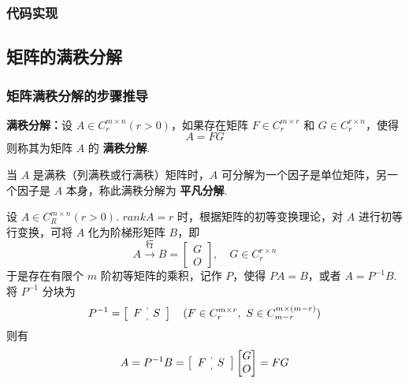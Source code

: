         \subsubsection{代码实现}
            

    \subsection{矩阵的满秩分解}
        \subsubsection{矩阵满秩分解的步骤推导}
            \par \textbf{满秩分解：}设 $A \in C_r^{m \times n}(r > 0)$，如果存在矩阵 $F \in C_r^{m \times r}$ 和 $G \in C_r^{r \times n}$，使得
            \begin{equation*}
                A = FG
            \end{equation*}
            则称其为矩阵 $A$ 的 \textbf{满秩分解}.
            \par 当 $A$ 是满秩（列满秩或行满秩）矩阵时，$A$ 可分解为一个因子是单位矩阵，另一个因子是 $A$ 本身，称此满秩分解为 \textbf{平凡分解}.
            \par 设 $A \in C_R^{m \times n}(r > 0)$. $rankA = r$ 时，根据矩阵的初等变换理论，对 $A$ 进行初等行变换，可将 $A$ 化为阶梯形矩阵 $B$，即
            \begin{equation*}
                A \stackrel{\text{行}}{\longrightarrow} B = \begin{bmatrix}
                    G \\ O
                \end{bmatrix}, \quad G \in C_r^{r \times n}
            \end{equation*}
            于是存在有限个 $m$ 阶初等矩阵的乘积，记作 $P$，使得 $PA = B$，或者 $A = P^{-1}B$. 将 $P^{-1}$ 分块为
            \begin{equation*}
                P^{-1} = \left[\begin{array}{c:c} F & S \end{array}\right] \quad (F \in C_r^{m \times r}, \ S \in C_{m-r}^{m \times (m-r)})
            \end{equation*}
            则有
            \begin{equation*}
                A = P^{-1}B = \left[\begin{array}{c:c} F & S \end{array}\right]\begin{bmatrix}
                    G \\ O
                \end{bmatrix} = FG
            \end{equation*}
